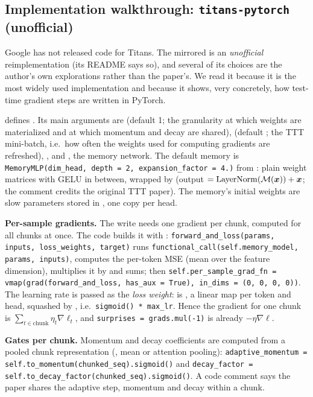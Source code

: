 \subsection{Implementation walkthrough: \texttt{titans-pytorch} (unofficial)}

Google has not released code for Titans. The mirrored  is an
\emph{unofficial} reimplementation (its README says so), and several of its choices are the
author's own explorations rather than the paper's. We read it because it is the most widely
used implementation and because it shows, very concretely, how test-time gradient steps are
written in PyTorch.

\begin{implnote}[title={In the code: the \texttt{NeuralMemory} module}]
 defines . Its main arguments
are  (default 1; the granularity at which weights are materialized and at
which momentum and decay are shared),  (default ; the TTT
mini-batch, i.e.\ how often the weights used for computing gradients are refreshed),
, and , the memory network. The default memory is
\texttt{MemoryMLP(dim\_head, depth = 2, expansion\_factor = 4.)} from
: plain weight matrices with GELU in between,
wrapped by  (output $= \operatorname{LayerNorm}(\mathcal{M}(\bm{x})) + \bm{x}$; the comment
credits the original TTT paper). The memory's initial weights are slow parameters stored in
, one copy per head.

\textbf{Per-sample gradients.} The write needs one gradient per chunk, computed for all chunks
at once. The code builds it with :
\texttt{forward\_and\_loss(params, inputs, loss\_weights, target)} runs
\texttt{functional\_call(self.memory\_model, params, inputs)}, computes the per-token MSE (mean
over the feature dimension), multiplies it by  and sums; then
\texttt{self.per\_sample\_grad\_fn = vmap(grad(forward\_and\_loss, has\_aux = True), in\_dims = (0, 0, 0, 0))}.
The learning rate is passed as the \emph{loss weight}:  is
, a linear map per token and head, squashed by
, i.e.\ \texttt{sigmoid() * max\_lr}. Hence the gradient
for one chunk is $\sum_{t\in\text{chunk}}\eta_t\nabla\ell_t$, and \texttt{surprises = grads.mul(-1)}
is already $-\eta\nabla\ell$.

\textbf{Gates per chunk.} Momentum and decay coefficients are computed from a pooled chunk
representation (, mean or attention pooling):
\texttt{adaptive\_momentum = self.to\_momentum(chunked\_seq).sigmoid()} and
\texttt{decay\_factor = self.to\_decay\_factor(chunked\_seq).sigmoid()}. A code comment says the
paper shares the adaptive step, momentum and decay within a chunk.
\end{implnote}

